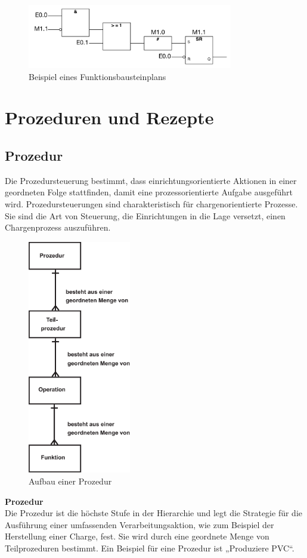 	\begin{figure}[h!]
  		\centering
    	\includegraphics[width=0.8\textwidth]{graphics/stateoftheart/funktionsbausteinplan_Selfmade.png}
  		\caption{Beispiel eines Funktionsbausteinplans \cite{funktionsbausteinplan}}
	\end{figure}

\section{Prozeduren und Rezepte}
\subsection{Prozedur}
Die Prozedursteuerung bestimmt, dass einrichtungsorientierte Aktionen in einer geordneten Folge stattfinden, damit eine prozessorientierte Aufgabe ausgeführt wird. Prozedursteuerungen sind charakteristisch für chargenorientierte Prozesse. Sie sind die Art von Steuerung, die Einrichtungen in die Lage versetzt, einen Chargenprozess auszuführen.\\

\begin{figure}[h!]
		\centering
		\includegraphics[width=0.4\textwidth]{graphics/stateoftheart/prozedursteuerung.png}
		\caption{Aufbau einer Prozedur}
\end{figure} 
\newpage
\textbf{Prozedur}\\
Die Prozedur ist die höchste Stufe in der Hierarchie und legt die Strategie für die Ausführung einer umfassenden Verarbeitungsaktion, wie zum Beispiel der Herstellung einer Charge, fest. Sie wird durch eine geordnete Menge von Teilprozeduren bestimmt. Ein Beispiel für eine Prozedur ist „Produziere PVC“.\\

